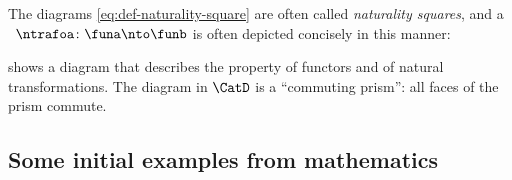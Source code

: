 The diagrams \cref{eq:def-naturality-square} are often called \emph{naturality squares}, and a ~$\ntrafoa \colon \funa\nto \funb$ is often depicted concisely in this manner:

 shows a diagram that describes the property of functors and of natural transformations.
The diagram in $\CatD$ is a ``commuting prism'': all faces of the prism commute.

\begin{figure}[h]
    \centering
    \begin{ctdefinitionshade}
        \small
    \end{ctdefinitionshade}
    \caption{}
    \label{fig:nat_trans_graphically}
\end{figure}


\subsection{Some initial examples from mathematics}

